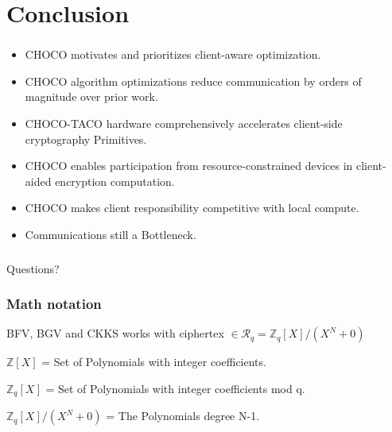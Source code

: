 \documentclass[10pt]{beamer}
\begin{document}
\section{Conclusion}
\begin{frame}
\frametitle{}
\begin{itemize}
    \item CHOCO motivates and prioritizes client-aware optimization.
    \item CHOCO algorithm optimizations reduce communication by orders of magnitude over prior work.
\pause
    \item CHOCO-TACO hardware comprehensively accelerates client-side cryptography Primitives.
    \item CHOCO enables participation from resource-constrained devices in client-aided encryption computation.
\pause
    \item CHOCO makes client responsibility competitive with local compute.
    \item Communications still a Bottleneck.
\end{itemize}

\end{frame}


\begin{frame}
\frametitle{}
\Huge

\begin{center}
   Questions?
\end{center}
\end{frame}




\begin{frame}[noframenumbering]
\frametitle{Math notation}
BFV, BGV and CKKS works with ciphertex  $\in \mathcal{R}_q =\mathbb{Z}_q[X]/(X^N+0)$

$\mathbb{Z}[X]$ = Set of Polynomials with integer coefficients.

$\mathbb{Z}_q[X]$ = Set of Polynomials with integer coefficients mod q.

$\mathbb{Z}_q[X]/(X^N+0)$ = The Polynomials degree N-1.


\end{frame}
\end{document}
